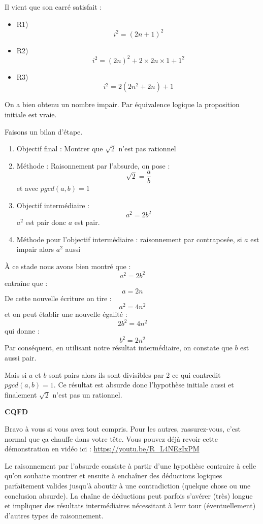 \documentclass[a4paper,11pt]{book}
\begin{document}
Il vient que son carré satisfait :

\begin{itemize}
\item R1) \[i^2 = (2n + 1)^2\]
\item R2) \[i^2 = (2n)^2 + 2\times 2n\times 1 + 1^2\]
\item R3) \[i^2 = 2(2n^2 + 2n) + 1\]
\end{itemize}


On a bien obtenu un nombre impair. Par équivalence logique la
proposition initiale est vraie.

Faisons un bilan d'étape.

\begin{enumerate}
\item Objectif final : Montrer que \(\sqrt{2}\) n'est pas
rationnel
\item Méthode : Raisonnement par l'absurde,
on pose :
\[\sqrt{2} = \dfrac{a}{b}\]
et avec \(pgcd(a, b) = 1\)
\item Objectif intermédiaire :
\[a^2 = 2b^2\]
\(a^2\) est pair donc \(a\) est pair.
\item Méthode pour l'objectif intermédiaire : raisonnement par
contraposée, si \(a\) est impair alors \(a^2\) aussi
\end{enumerate}


À ce stade nous avons bien montré que :
\[a^2 = 2b^2\]
entraîne que :
\[a = 2n\]
De cette nouvelle écriture on tire :
\[a^2 = 4n^2\]
et on peut établir une nouvelle égalité :
\[2b^2 = 4n^2\]
qui donne :
\[b^2 = 2n^2\]
Par conséquent, en utilisant notre résultat intermédiaire, on constate
que \(b\) est aussi pair.

Mais si \(a\) et \(b\) sont pairs alors ils sont divisibles par \(2\)
ce qui contredit \(pgcd(a, b) = 1\).
Ce résultat est absurde donc l'hypothèse
initiale aussi et finalement \(\sqrt{2}\) n'est pas un
rationnel.


\textbf{CQFD}

\clearpage

Bravo à vous si vous avez tout compris. Pour les autres,
rassurez-vous, c'est normal que ça chauffe dans votre tête. Vous
pouvez déjà revoir cette démonstration en vidéo ici :
\url{https://youtu.be/R\_L4NEgIxPM}

Le raisonnement par l'absurde consiste à partir
d'une hypothèse contraire à celle qu'on souhaite montrer et ensuite à
enchaîner des déductions logiques parfaitement valides jusqu'à aboutir
à une contradiction (quelque chose ou une conclusion absurde). La
chaîne de déductions peut parfois s'avérer (très) longue et impliquer
des résultats intermédiaires nécessitant à leur tour (éventuellement)
d'autres types de raisonnement.
\end{document}

